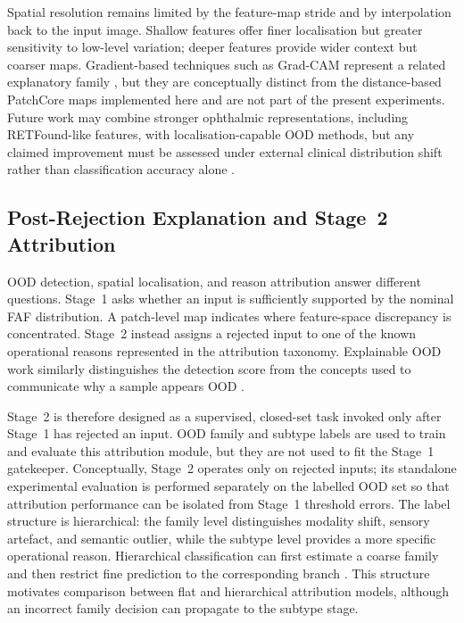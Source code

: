 \documentclass[fleqn,12pt]{olplainarticle}
\begin{document}
Spatial resolution remains limited by the feature-map stride and by interpolation back to the input image. Shallow features offer finer localisation but greater sensitivity to low-level variation; deeper features provide wider context but coarser maps. Gradient-based techniques such as Grad-CAM represent a related explanatory family \cite{selvaraju2017grad}, but they are conceptually distinct from the distance-based PatchCore maps implemented here and are not part of the present experiments. Future work may combine stronger ophthalmic representations, including RETFound-like features, with localisation-capable OOD methods, but any claimed improvement must be assessed under external clinical distribution shift rather than classification accuracy alone \cite{zhou2023retfound,oquab2023dinov2}.

\subsection{Post-Rejection Explanation and Stage~2 Attribution}
\label{sec:stage2_literature}

OOD detection, spatial localisation, and reason attribution answer different questions. Stage~1 asks whether an input is sufficiently supported by the nominal FAF distribution. A patch-level map indicates where feature-space discrepancy is concentrated. Stage~2 instead assigns a rejected input to one of the known operational reasons represented in the attribution taxonomy. Explainable OOD work similarly distinguishes the detection score from the concepts used to communicate why a sample appears OOD \cite{choi2023concept}.

Stage~2 is therefore designed as a supervised, closed-set task invoked only
after Stage~1 has rejected an input. OOD family and subtype labels are used to
train and evaluate this attribution module, but they are not used to fit the
Stage~1 gatekeeper. Conceptually, Stage~2 operates only on rejected inputs; its
standalone experimental evaluation is performed separately on the labelled
OOD set so that attribution performance can be isolated from Stage~1 threshold
errors. The label structure is hierarchical: the family level distinguishes
modality shift, sensory artefact, and semantic outlier, while the subtype level
provides a more specific operational reason. Hierarchical classification can
first estimate a coarse family and then restrict fine prediction to the
corresponding branch \cite{silla2011hierarchical}. This structure motivates
comparison between flat and hierarchical attribution models, although an
incorrect family decision can propagate to the subtype stage.
\end{document}
